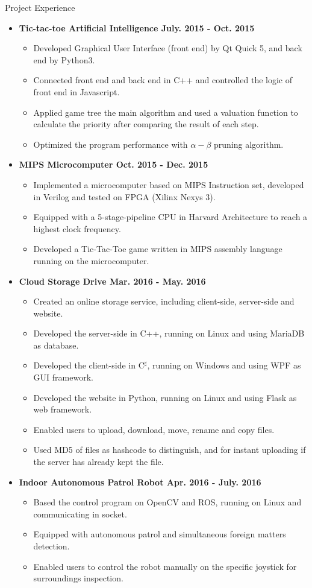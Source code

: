 \documentclass[10pt,oneside]{article}
\newenvironment{ressection}[1]{
	\vspace{4pt}
	{\fontfamily{phv}\selectfont\Large#1}
	\begin{itemize}
	\vspace{3pt}
}{
	\end{itemize}
}
\newcommand{\resitem}[1]{
	\vspace{-4pt}
	\item \begin{flushleft} #1 \end{flushleft}
}
\newcommand{\ressubitem}[1]{
	\vspace{-1pt}
	\item \begin{flushleft} #1 \end{flushleft}
}
\newenvironment{reslist}[1]{
	\resitem{\textbf{#1}}
	\vspace{-5pt}
	\begin{itemize}
}{
	\end{itemize}
}
\begin{document}
\begin{ressection}{Project Experience}
	\begin{reslist}{Tic-tac-toe Artificial Intelligence \hfill July. 2015 - Oct. 2015}
		\ressubitem{Developed Graphical User Interface (front end) by Qt Quick 5, and back end by Python3.}
		\ressubitem{Connected front end and back end in C++ and controlled the logic of front end in Javascript.}
		\ressubitem{Applied game tree the main algorithm and used a valuation function to calculate the priority after comparing the result of each step.}
		\ressubitem{Optimized the program performance with $\alpha-\beta$ pruning algorithm.}
	\end{reslist}
	\begin{reslist}{MIPS Microcomputer \hfill Oct. 2015 - Dec. 2015}
		\ressubitem{Implemented a microcomputer based on MIPS Instruction set, developed in Verilog and tested on FPGA (Xilinx Nexys 3). }
		\ressubitem{Equipped with a 5-stage-pipeline CPU in Harvard Architecture to reach a highest clock frequency.}
		\ressubitem{Developed a Tic-Tac-Toe game written in MIPS assembly language running on the microcomputer.}
	\end{reslist}
	\begin{reslist}{Cloud Storage Drive \hfill Mar. 2016 - May. 2016}
		\ressubitem{Created an online storage service, including client-side, server-side and website.}
		\ressubitem{Developed the server-side in C++, running on Linux and using MariaDB as database.}
		\ressubitem{Developed the client-side in C$^\sharp$, running on Windows and using WPF as GUI framework.}
		\ressubitem{Developed the website in Python, running on Linux and using Flask as web framework.}
		\ressubitem{Enabled users to upload, download, move, rename and copy files.}
		\ressubitem{Used MD5 of files as hashcode to distinguish, and for instant uploading if the server has already kept the file.}
	\end{reslist}
	\begin{reslist}{Indoor Autonomous Patrol Robot \hfill Apr. 2016 - July. 2016}
		\ressubitem{Based the control program on OpenCV and ROS, running on Linux and communicating in socket.}
		\ressubitem{Equipped with autonomous patrol and simultaneous foreign matters detection.}
		\ressubitem{Enabled users to control the robot manually on the specific joystick for surroundings inspection.}
	\end{reslist}
\end{ressection}

\end{document}
